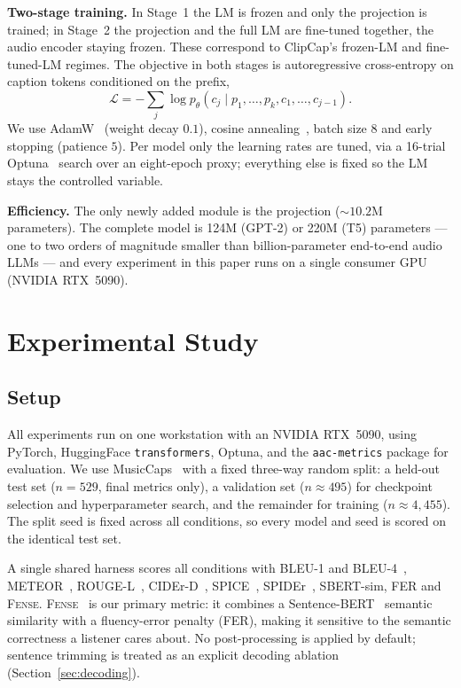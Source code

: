 \documentclass[conference]{IEEEtran}
\newcommand{\fense}{\textsc{Fense}}
\begin{document}
\textbf{Two-stage training.} In Stage~1 the LM is frozen and only the projection is trained; in
Stage~2 the projection and the full LM are fine-tuned together, the audio encoder staying
frozen. These correspond to ClipCap's frozen-LM and fine-tuned-LM regimes. The objective in both
stages is autoregressive cross-entropy on caption tokens conditioned on the prefix,
\[
  \mathcal{L} = -\sum_{j}\log p_\theta\!\left(c_j \mid p_1,\dots,p_k, c_1,\dots,c_{j-1}\right).
\]
We use AdamW~\cite{loshchilov2019adamw} (weight decay $0.1$), cosine
annealing~\cite{loshchilov2017sgdr}, batch size $8$ and early stopping (patience $5$). Per
model only the learning rates are tuned, via a 16-trial Optuna~\cite{akiba2019optuna} search
over an eight-epoch proxy; everything else is fixed so the LM stays the controlled variable.

\textbf{Efficiency.} The only newly added module is the projection ($\sim$$10.2$M parameters).
The complete model is 124M (GPT-2) or 220M (T5) parameters --- one to two orders of magnitude
smaller than billion-parameter end-to-end audio LLMs --- and every experiment in this paper runs
on a single consumer GPU (NVIDIA RTX~5090).

\section{Experimental Study}\label{ch:experiments}

\subsection{Setup}

All experiments run on one workstation with an NVIDIA RTX~5090, using PyTorch, HuggingFace
\texttt{transformers}, Optuna, and the \texttt{aac-metrics} package for evaluation. We use
MusicCaps~\cite{agostinelli2023musiclm} with a fixed three-way random split: a held-out test set
($n{=}529$, final metrics only), a validation set ($n{\approx}495$) for checkpoint selection and
hyperparameter search, and the remainder for training ($n{\approx}4{,}455$). The split seed is
fixed across all conditions, so every model and seed is scored on the identical test set.

A single shared harness scores all conditions with BLEU-1 and BLEU-4~\cite{papineni2002bleu},
METEOR~\cite{banerjee2005meteor}, ROUGE-L~\cite{lin2004rouge}, CIDEr-D~\cite{vedantam2015cider},
SPICE~\cite{anderson2016spice}, SPIDEr~\cite{liu2017spider}, SBERT-sim, FER and \fense{}.
\fense{}~\cite{zhou2022fense} is our primary metric: it combines a
Sentence-BERT~\cite{reimers2019sbert} semantic similarity with a fluency-error penalty (FER),
making it sensitive to the semantic correctness a listener cares about. No post-processing is
applied by default; sentence trimming is treated as an explicit decoding ablation
(Section~\ref{sec:decoding}).
\end{document}
